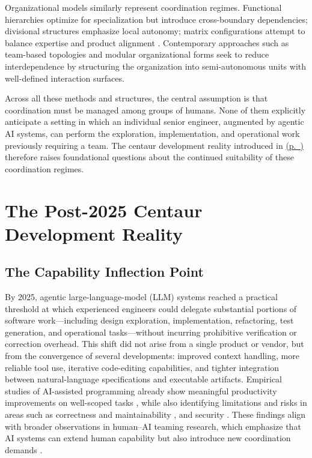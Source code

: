 \documentclass[11pt, a4paper, twocolumn]{article} %
\newcommand{\namerefp}[1]{\hyperref[#1]{\nameref{#1} (p.~\pageref{#1})}}
\begin{document}
Organizational models similarly represent coordination regimes. Functional
hierarchies optimize for specialization but introduce cross-boundary
dependencies; divisional structures emphasize local autonomy; matrix
configurations attempt to balance expertise and product alignment
\citep{mintzberg1979}. Contemporary approaches such as team-based topologies
\citep{teamtopologies} and modular organizational forms \citep{sanchez1996modular}
seek to reduce interdependence by structuring the organization into
semi-autonomous units with well-defined interaction surfaces.

Across all these methods and structures, the central assumption is that
coordination must be managed among groups of humans. None of them explicitly
anticipate a setting in which an individual senior engineer, augmented by
agentic AI systems, can perform the exploration, implementation, and operational
work previously requiring a team. The centaur development reality introduced in
\namerefp{sec:introduction} therefore raises foundational questions about the
continued suitability of these coordination regimes.

\section*{The Post-2025 Centaur Development Reality}
\label{sec:centaur-reality}

\subsection*{The Capability Inflection Point}

By 2025, agentic large-language-model (LLM) systems reached a practical
threshold at which experienced engineers could delegate substantial portions of
software work---including design exploration, implementation, refactoring,
test generation, and operational tasks---without incurring prohibitive
verification or correction overhead. This shift did not arise from a single
product or vendor, but from the convergence of several developments: improved
context handling, more reliable tool use, iterative code-editing capabilities,
and tighter integration between natural-language specifications and executable
artifacts. Empirical studies of AI-assisted programming already show meaningful
productivity improvements on well-scoped tasks \citep{peng2023copilot}, while
also identifying limitations and risks in areas such as correctness and
maintainability \citep{ercin2025,schreiber2025aicodevuln}, and security \citep{oladele2025aivulnerabilities,schreiber2025aicodevuln}. These findings align with
broader observations in
human--AI teaming research, which emphasize that AI systems can extend human
capability but also introduce new coordination demands
\citep{seeber2020machines,schmutz2024aiteaming}.
\end{document}
